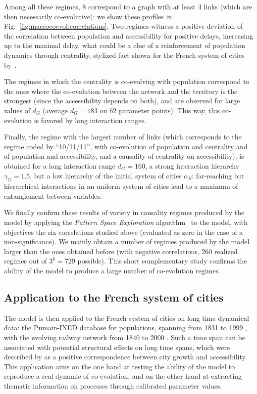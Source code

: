 \documentclass[11pt]{article}
\begin{document}
Among all these regimes, 8 correspond to a graph with at least 4 links (which are then necessarily co-evolutive): we show these profiles in Fig.~\ref{fig:macrocoevol:correlations}. Two regimes witness a positive deviation of the correlation between population and accessibility for positive delays, increasing up to the maximal delay, what could be a clue of a reinforcement of population dynamics through centrality, stylized fact shown for the French system of cities by~\cite{bretagnolle:tel-00459720}.


The regimes in which the centrality is co-evolving with population correspond to the ones where the co-evolution between the network and the territory is the strongest (since the accessibility depends on both), and are observed for large values of $d_G$ (average $d_G=183$ on 62 parameter points). This way, this co-evolution is favored by long interaction ranges. 


Finally, the regime with the largest number of links (which corresponds to the regime coded by ``10/11/11'', with co-evolution of population and centrality and of population and accessibility, and a causality of centrality on accessibility), is obtained for a long interaction range $d_G = 160$, a strong interaction hierarchy $\gamma_G = 1.5$, but a low hierarchy of the initial system of cities $\alpha_S$: far-reaching but hierarchical interactions in an uniform system of cities lead to a maximum of entanglement between variables.  





We finally confirm these results of variety in causality regimes produced by the model by applying the \emph{Pattern Space Exploration} algorithm~\citep{10.1371/journal.pone.0138212} to the model, with objectives the six correlations studied above (evaluated as zero in the case of a non-significance). We mainly obtain a number of regimes produced by the model larger than the ones obtained before (with negative correlations, 260 realized regimes out of $3^6 = 729$ possible). This short complementary study confirms the ability of the model to produce a large number of co-evolution regimes. 


\subsection{Application to the French system of cities}


The model is then applied to the French system of cities on long time dynamical data: the Pumain-INED database for populations, spanning from 1831 to 1999 \citep{pumain1986fichier}, with the evolving railway network from 1840 to 2000 \citep{thevenin2013mapping}. Such a time span can be associated with potential structural effects on long time spans, which were described by \cite{bretagnolle2003vitesse} as a positive correspondence between city growth and accessibility. This application aims on the one hand at testing the ability of the model to reproduce a real dynamic of co-evolution, and on the other hand at extracting thematic information on processes through calibrated parameter values.
\end{document}
